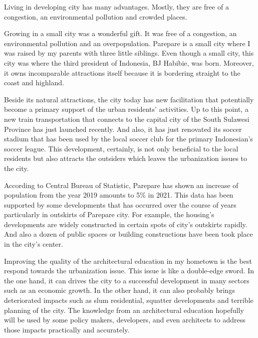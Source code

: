 \documentclass[../main.tex]{subfiles}
\begin{document}
\begin{tcolorbox}[%
		enhanced,
		width=\textwidth,
		breakable,
		colback=white,
		boxsep=1pt,left=2pt,right=2pt,top=1pt,bottom=0pt,
		frame hidden,
		overlay broken = {
				\draw[line width=.5mm, black, sharp corners]
				(frame.north west) rectangle (frame.south east);},
	]{}
	Living in developing city has many advantages. Mostly, they are free of a congestion, an environmental pollution and crowded places.

	Growing in a small city was a wonderful gift. It was free of a congestion, an environmental pollution and an overpopulation. Parepare is a small city where I was raised by my parents with three little siblings. Even though a small city, this city was where the third president of Indonesia, BJ Habibie, was born.
	Moreover, it owns incomparable attractions itself because it is bordering straight to the coast and highland.

	Beside its natural attractions, the city today has new facilitation that potentially become a primary support of the urban residents' activities.
	Up to this point, a new train transportation that connects to the capital city of the South Sulawesi Province has just launched recently.
	And also, it has just renovated its soccer stadium that has been used by the local soccer club for the primary Indonesian's soccer league.
	This development, certainly, is not only beneficial to the local residents but also attracts the outsiders which leaves the urbanization issues to the city.

	According to Central Bureau of Statistic, Parepare has shown an increase of population from the year 2019 amounts to 5\% in 2021. This data has been supported by some developments that has occurred over the course of years particularly in outskirts of Parepare city. For example, the housing's developments are widely constructed in certain spots of city's outskirts rapidly. And also a dozen of public spaces or building constructions have been took place in the city's center.

	Improving the quality of the architectural education in my hometown is the best respond towards the urbanization issue.
	This issue is like a double-edge sword. In the one hand, it can drives the city to a successful development in many sectors such as an economic growth. In the other hand, it can also probably brings deteriorated impacts such as slum residential, squatter developments and terrible planning of the city. The knowledge from an architectural education hopefully will be used by some policy makers, developers, and even architects to address those impacts practically and accurately.


\end{tcolorbox}
\end{document}
